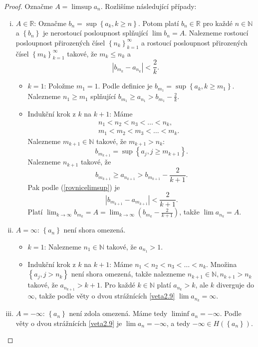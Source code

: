 \begin{proof}
	Označme $A = \limsup a_n$. Rozlišíme následující případy:
	\begin{enumerate}[(i)]
		\item $A \in \mathbb R $: Označme $b_n = \sup \left \{ a_k, k \geq n \right \} $.
		Potom platí $b_n \in \mathbb R $ pro každé $n \in \mathbb N $ a
		$\left \{ b_n \right \} $ je nerostoucí posloupnost splňující $\lim b_n = A$. Nalezneme
		rostoucí posloupnost přirozených čísel $\left \{ n_k \right \}_{k=1}^\infty $
		a rostoucí posloupnost přirozených čísel $\left \{ m_k \right \}_{k=1}^\infty $
		takové, že $m_k \leq n_k$ a
		\begin{equation}\label{rovnicelimsup}
		    \left | b_{m_k} - a_{n_k}\right |< \frac{2}{k}.
		\end{equation}
		\begin{itemize}
			\item $k = 1$: Položme $m_1 = 1$. Podle definice je $b_{m_1} = \sup \left \{ a_k, k \geq m_1 \right \}$.
			Nalezneme $n_1 \geq m_1$ splňující $b_{m_1} \geq a_{n_1} > b_{m_1} - \frac{2}{k}$.
			\item Indukční krok z $k$ na $k+1$: Máme
			\begin{align*}
				n_1 < n_2 < n_3 < \dots  < n_k, &\\
				m_1 < m_2 < m_3 < \dots  < m_k.&
			\end{align*}
			Nalezneme $m_{k+1}\in \mathbb N $ takové, že $m_{k+1}>n_k$:
			$$
			    b_{m_{k+1}} = \sup \left \{ a_j, j \geq m_{k+1} \right \}.
			$$
			Nalezneme $n_{k+1}$ takové, že
			$$
			    b_{m_{k+1}} \geq a_{n_{k+1}} > b_{m_{k+1}} - \frac{2}{k+1}.
			$$
			Pak podle (\ref{rovnicelimsup}) je
			$$
			    |b_{m_{k+1}} - a_{m_{k+1}}| < \frac{2}{k+1}.
			$$
			Platí $\lim_{k\to\infty} b_{m_k} = A = \lim_{k\to\infty} \left( b_{m_k}-\frac{2}{k+1} \right ) $,
			takže $\lim a_{n_k} = A.$
		\end{itemize}
		\item $A = \infty$: $\left \{ a_n \right \} $ není shora omezená.
		\begin{itemize}
			\item $k = 1$: Nalezneme $n_1 \in \mathbb N $ takové, že $a_{n_1} > 1$.
			\item Indukční krok z $k$ na $k+1$: Máme $n_1 < n_2 < n_3 < \dots < n_k$.
			Množina $\left \{ a_j, j > n_k \right \}$ není shora omezená, takže nalezneme
			$n_{k+1} \in \mathbb N , n_{k+1} > n_k$ takové, že $a_{n_{k+1}} > k+1$.
			Pro každé $k \in \mathbb N $ platí $a_{n_k} > k$, ale $k$ diverguje do $\infty$, takže
			podle věty o dvou strážnících \ref{veta2.9}
			$\lim a_{n_k} = \infty$.
		\end{itemize}
		\item $A = -\infty$: $\left \{ a_n \right \} $ není zdola omezená. Máme tedy $\liminf a_n = -\infty$.
		Podle věty o dvou strážnících \ref{veta2.9}
		je $\lim a_n = -\infty$, a tedy $-\infty \in H \left(  \left \{ a_n \right \}  \right ) $.
	\end{enumerate}

\end{proof}
